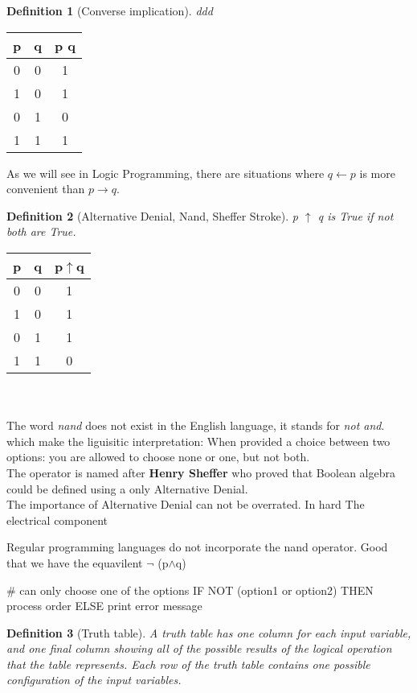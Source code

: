 \documentclass[10pt,a4paper,draft,titlepage,onecolumn]{book}
\newtheorem{definition}{Definition}[section]
\begin{document}
\begin{definition}[Converse implication]ddd
\end{definition}

\begin{tabular}{ |c|c|c| }
 \hline
 p & q &  p  q  \\
 \hline
 0 & 0 & 1 \\
 1 & 0 & 1\\
 0 & 1 & 0\\
 1 & 1 & 1\\
 \hline
\end{tabular}

As we will see in Logic Programming, there are situations where $q  \leftarrow p$  is more convenient than $ p \rightarrow q$.

\begin{definition}[Alternative Denial, Nand, Sheffer Stroke]
p $\uparrow$  q is True if not both are True.
\end{definition}

\begin{tabular}{ |c|c|c| }
 \hline
 p & q &  p$\uparrow$q  \\
 \hline
 0 & 0 & 1 \\
 1 & 0 & 1\\
 0 & 1 & 1\\
 1 & 1 & 0\\
 \hline
\end{tabular}  \\\\
The word \textit{nand} does not exist in the English language, it stands for \textit{not and}. which make the liguisitic interpretation: When provided a choice between two options: you are allowed to choose none or one, but not both.\\
The operator is named after \textbf{Henry Sheffer} who proved that Boolean algebra could be defined using a only Alternative Denial. \\

The importance of Alternative Denial can not be overrated. In hard The electrical component 



Regular programming languages do not incorporate the nand operator. Good that we have the equavilent $\neg$ (p$\wedge$q) 

\# can only choose one of the options
IF NOT (option1 or option2) THEN 
	process order\(\)
ELSE 
	print error message

\begin{definition}[Truth table] A truth table has one column for each input variable, and one final column showing all of the possible results of the logical operation that the table represents. Each row of the truth table contains one possible configuration of the input variables.
\end{definition} 
\end{document}
